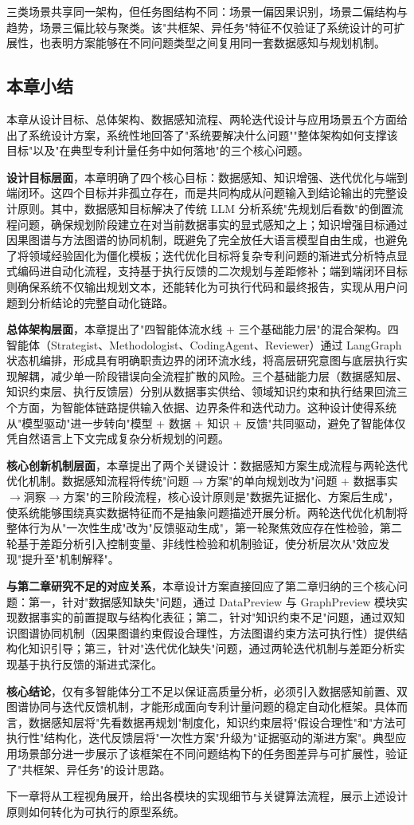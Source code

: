 三类场景共享同一架构，但任务图结构不同：场景一偏因果识别，场景二偏结构与趋势，场景三偏比较与聚类。该"共框架、异任务"特征不仅验证了系统设计的可扩展性，也表明方案能够在不同问题类型之间复用同一套数据感知与规划机制。

\subsection{本章小结}

本章从设计目标、总体架构、数据感知流程、两轮迭代设计与应用场景五个方面给出了系统设计方案，系统性地回答了"系统要解决什么问题""整体架构如何支撑该目标"以及"在典型专利计量任务中如何落地"的三个核心问题。

\textbf{设计目标层面}，本章明确了四个核心目标：数据感知、知识增强、迭代优化与端到端闭环。这四个目标并非孤立存在，而是共同构成从问题输入到结论输出的完整设计原则。其中，数据感知目标解决了传统 LLM 分析系统"先规划后看数"的倒置流程问题，确保规划阶段建立在对当前数据事实的显式感知之上；知识增强目标通过因果图谱与方法图谱的协同机制，既避免了完全放任大语言模型自由生成，也避免了将领域经验固化为僵化模板；迭代优化目标将复杂专利问题的渐进式分析特点显式编码进自动化流程，支持基于执行反馈的二次规划与差距修补；端到端闭环目标则确保系统不仅输出规划文本，还能转化为可执行代码和最终报告，实现从用户问题到分析结论的完整自动化链路。

\textbf{总体架构层面}，本章提出了"四智能体流水线 + 三个基础能力层"的混合架构。四智能体（Strategist、Methodologist、CodingAgent、Reviewer）通过 LangGraph 状态机编排，形成具有明确职责边界的闭环流水线，将高层研究意图与底层执行实现解耦，减少单一阶段错误向全流程扩散的风险。三个基础能力层（数据感知层、知识约束层、执行反馈层）分别从数据事实供给、领域知识约束和执行结果回流三个方面，为智能体链路提供输入依据、边界条件和迭代动力。这种设计使得系统从"模型驱动"进一步转向"模型 + 数据 + 知识 + 反馈"共同驱动，避免了智能体仅凭自然语言上下文完成复杂分析规划的问题。

\textbf{核心创新机制层面}，本章提出了两个关键设计：数据感知方案生成流程与两轮迭代优化机制。数据感知流程将传统"问题$\rightarrow$方案"的单向规划改为"问题 + 数据事实$\rightarrow$洞察$\rightarrow$方案"的三阶段流程，核心设计原则是"数据先证据化、方案后生成"，使系统能够围绕真实数据特征而不是抽象问题描述开展分析。两轮迭代优化机制将整体行为从"一次性生成"改为"反馈驱动生成"，第一轮聚焦效应存在性检验，第二轮基于差距分析引入控制变量、非线性检验和机制验证，使分析层次从"效应发现"提升至"机制解释"。

\textbf{与第二章研究不足的对应关系}，本章设计方案直接回应了第二章归纳的三个核心问题：第一，针对"数据感知缺失"问题，通过 DataPreview 与 GraphPreview 模块实现数据事实的前置提取与结构化表征；第二，针对"知识约束不足"问题，通过双知识图谱协同机制（因果图谱约束假设合理性，方法图谱约束方法可执行性）提供结构化知识引导；第三，针对"迭代优化缺失"问题，通过两轮迭代机制与差距分析实现基于执行反馈的渐进式深化。

\textbf{核心结论}，仅有多智能体分工不足以保证高质量分析，必须引入数据感知前置、双图谱协同与迭代反馈机制，才能形成面向专利计量问题的稳定自动化框架。具体而言，数据感知层将"先看数据再规划"制度化，知识约束层将"假设合理性"和"方法可执行性"结构化，迭代反馈层将"一次性方案"升级为"证据驱动的渐进方案"。典型应用场景部分进一步展示了该框架在不同问题结构下的任务图差异与可扩展性，验证了"共框架、异任务"的设计思路。

下一章将从工程视角展开，给出各模块的实现细节与关键算法流程，展示上述设计原则如何转化为可执行的原型系统。
